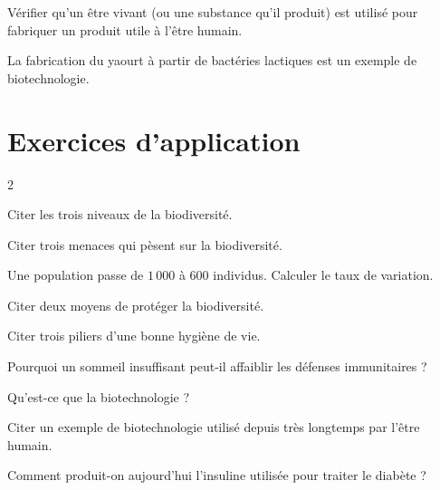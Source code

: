 Vérifier qu'un être vivant (ou une substance qu'il produit) est utilisé pour fabriquer un
produit utile à l'être humain.
\begin{exemple}
La fabrication du yaourt à partir de bactéries lactiques est un exemple de
biotechnologie.
\end{exemple}

\section{Exercices d'application}
\begin{multicols}{2}

\exo{} Citer les trois niveaux de la biodiversité.

\exo{} Citer trois menaces qui pèsent sur la biodiversité.

\exo{} Une population passe de $1\,000$ à $600$ individus. Calculer le taux de
variation.

\exo{} Citer deux moyens de protéger la biodiversité.

\exo{} Citer trois piliers d'une bonne hygiène de vie.

\exo{} Pourquoi un sommeil insuffisant peut-il affaiblir les défenses
immunitaires ?

\exo{} Qu'est-ce que la biotechnologie ?

\exo{} Citer un exemple de biotechnologie utilisé depuis très longtemps par
l'être humain.

\exo{} Comment produit-on aujourd'hui l'insuline utilisée pour traiter le
diabète ?

\end{multicols}

